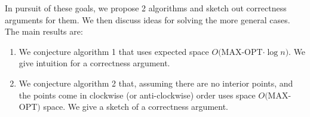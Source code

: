 \documentclass[12pt]{article}
\theoremstyle{definition}
\begin{document}
In pursuit of these goals, we propose 2 algorithms and sketch out correctness arguments for them. We then discuss ideas for solving the more general cases. The main results are:

\begin{enumerate}

\item We conjecture algorithm 1 that uses expected space $O($MAX-OPT$\cdot \log{n})$. We give intuition for a correctness argument.

\item We conjecture algorithm 2 that, assuming there are no interior points, and the points come in clockwise (or anti-clockwise) order uses space $O($MAX-OPT$)$ space. We give a sketch of a correctness argument.

\end{enumerate}
\end{document}
